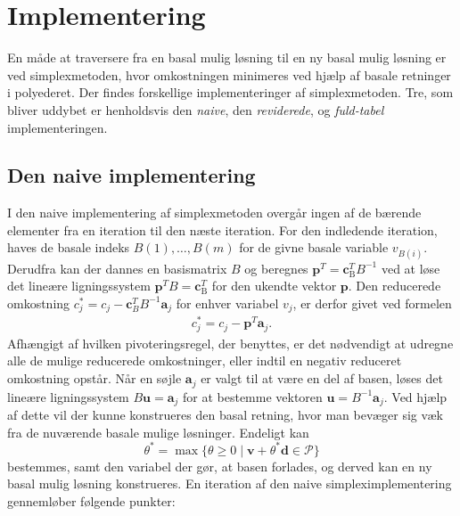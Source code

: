%
\section{Implementering}
\label{julieergudesmuk}
En måde at traversere fra en basal mulig løsning til en ny basal mulig løsning er ved simplexmetoden, hvor omkostningen minimeres ved hjælp af basale retninger i polyederet.
Der findes forskellige implementeringer af simplexmetoden.
Tre, som bliver uddybet er henholdsvis den \textit{naive}, den \textit{reviderede}, og \textit{fuld-tabel} implementeringen.
%
\subsection{Den naive implementering}
I den naive implementering af simplexmetoden overgår ingen af de bærende elementer fra en iteration til den næste iteration. 
For den indledende iteration, haves de basale indeks
$B(1),\ldots,B(m)$ for de givne basale variable $v_{B(i)}$. 
Derudfra kan der dannes en basismatrix $B$ og beregnes $\mathbf{p}^T=\mathbf{c}_{\text{B}}^T B^{-1}$ ved at løse det lineære ligningssystem $\mathbf{p}^T B=\mathbf{c}_{\text{B}}^T$ for den ukendte vektor $\mathbf{p}$.
Den reducerede omkostning $c_j^* = c_j - \mathbf{c}_B^T B^{-1}\textbf{a}_j$ for enhver variabel $v_j$, er derfor givet ved formelen
%
\begin{align*}
c_j^* = c_j - \mathbf{p}^T \textbf{a}_j.
\end{align*}
%
Afhængigt af hvilken pivoteringsregel, der benyttes, er det nødvendigt at udregne alle de mulige reducerede omkostninger, eller indtil en negativ reduceret omkostning opstår.
Når en søjle $\mathbf{a}_j$ er valgt til at være en del af basen, løses det lineære ligningssystem $B\mathbf{u}=\mathbf{a}_j$ for at bestemme vektoren $\mathbf{u}=B^{-1}\mathbf{a}_j$.
Ved hjælp af dette vil der kunne konstrueres den basal retning, hvor man bevæger sig væk fra de nuværende basale mulige løsninger.
Endeligt kan $$\theta^* = \max \{ \theta \geq 0 \mid \textbf{v} + \theta^*\textbf{d} \in \mathcal{P} \}$$ bestemmes, samt den variabel der gør, at basen forlades, og derved kan en ny basal mulig løsning konstrueres. 
En iteration af den naive simpleximplementering gennemløber følgende punkter: 
%
